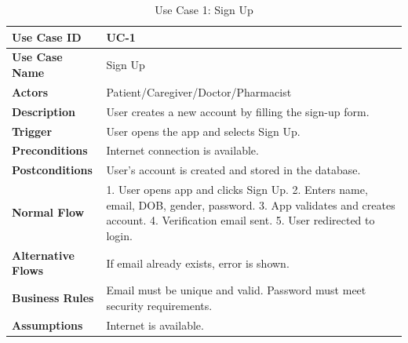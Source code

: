 
\begin{table}[H]
\centering
\caption{Use Case 1: Sign Up}
\begin{tabularx}{\textwidth}{|l|X|}
\hline
\textbf{Use Case ID} & UC-1 \\ \hline
\textbf{Use Case Name} & Sign Up \\ \hline
\textbf{Actors} & Patient/Caregiver/Doctor/Pharmacist \\ \hline
\textbf{Description} & User creates a new account by filling the sign-up form. \\ \hline
\textbf{Trigger} & User opens the app and selects Sign Up. \\ \hline
\textbf{Preconditions} & Internet connection is available. \\ \hline
\textbf{Postconditions} & User's account is created and stored in the database. \\ \hline
\textbf{Normal Flow} & 1. User opens app and clicks Sign Up. 2. Enters name, email, DOB, gender, password. 3. App validates and creates account. 4. Verification email sent. 5. User redirected to login. \\ \hline
\textbf{Alternative Flows} & If email already exists, error is shown. \\ \hline
\textbf{Business Rules} & Email must be unique and valid. Password must meet security requirements. \\ \hline
\textbf{Assumptions} & Internet is available. \\ \hline
\end{tabularx}
\end{table}

